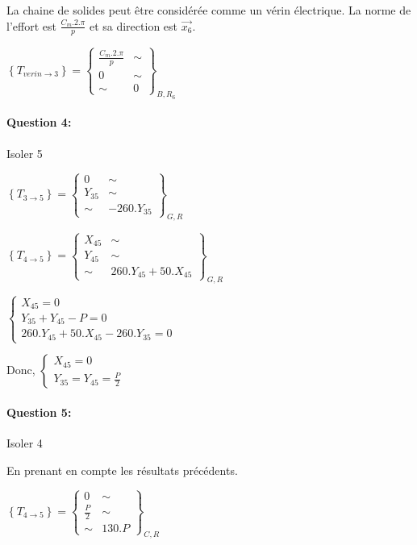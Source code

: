 La chaine de solides peut être considérée comme un vérin électrique. La norme de l'effort est $\frac{C_m.2.\pi}{p}$ et sa direction est $\overrightarrow{x_6}$.

$\left\{T_{verin \rightarrow 3}\right\}=\left\{
\begin{array}{cc}
\frac{C_m.2.\pi}{p} & \sim \\
0 & \sim \\
\sim & 0
\end{array}
\right\}_{B,R_6}$


\paragraph{Question 4:}

Isoler 5

$\left\{T_{3\rightarrow 5}\right\}=\left\{
\begin{array}{cc}
0 & \sim \\
Y_{35} & \sim \\
\sim & -260.Y_{35}
\end{array}
\right\}_{G,R}$

$\left\{T_{4\rightarrow 5}\right\}=\left\{
\begin{array}{cc}
X_{45} & \sim \\
Y_{45} & \sim \\
\sim & 260.Y_{45}+50.X_{45}
\end{array}
\right\}_{G,R}$

$\left\{\begin{array}{l}
X_{45}=0 \\
Y_{35}+Y_{45}-P=0 \\
260.Y_{45}+50.X_{45}-260.Y_{35}=0
\end{array}\right.$

Donc, $\left\{\begin{array}{l}
X_{45}=0 \\
Y_{35}=Y_{45}=\frac{P}{2}
\end{array}\right.$

\paragraph{Question 5:}

Isoler 4

En prenant en compte les résultats précédents.

$\left\{T_{4\rightarrow 5}\right\}=\left\{
\begin{array}{cc}
0 & \sim \\
\frac{P}{2} & \sim \\
\sim & 130.P
\end{array}
\right\}_{C,R}$

